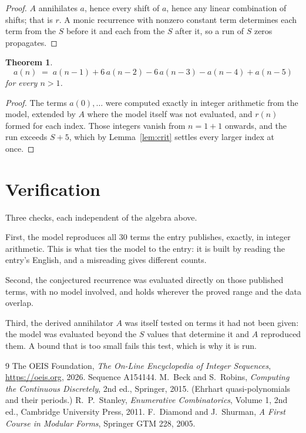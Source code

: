 \documentclass[11pt,a4paper]{article}
\theoremstyle{plain}
\newtheorem{theorem}{Theorem}
\theoremstyle{definition}
\begin{document}
\begin{proof}
$A$ annihilates $a$, hence every shift of $a$, hence any linear combination of shifts; that is
$r$. A monic recurrence with nonzero constant term determines each term from the $S$ before it
and each from the $S$ after it, so a run of $S$ zeros propagates.
\end{proof}

\begin{theorem}
\[
a(n)\;=\;a(n-1) + 6\,a(n-2) - 6\,a(n-3) - a(n-4) + a(n-5)
\]
for every $n>1$.
\end{theorem}

\begin{proof}
The terms $a(0),\dots$ were computed exactly in integer arithmetic from the model, extended by
$A$ where the model itself was not evaluated, and $r(n)$ formed for each index. Those integers
vanish from $n=1+1$ onwards, and the run exceeds $S+5$, which by
Lemma~\ref{lem:crit} settles every larger index at once.
\end{proof}

\section{Verification}

Three checks, each independent of the algebra above.

First, the model reproduces all $30$ terms the entry publishes, exactly, in integer
arithmetic. This is what ties the model to the entry: it is built by reading the entry's
English, and a misreading gives different counts.

Second, the conjectured recurrence was evaluated directly on those published terms, with no
model involved, and holds wherever the proved range and the data overlap.

Third, the derived annihilator $A$ was itself tested on terms it had not been given: the model
was evaluated beyond the $S$ values that determine it and $A$ reproduced them. A bound that is
too small fails this test, which is why it is run.

\begin{thebibliography}{9}
 The OEIS Foundation, \emph{The On-Line Encyclopedia of Integer
Sequences}, \url{https://oeis.org}, 2026. Sequence A154144.
 M.~Beck and S.~Robins, \emph{Computing the Continuous Discretely},
2nd ed., Springer, 2015. (Ehrhart quasi-polynomials and their periods.)
 R.~P.~Stanley, \emph{Enumerative Combinatorics}, Volume 1, 2nd ed.,
Cambridge University Press, 2011.
 F.~Diamond and J.~Shurman, \emph{A First Course in Modular Forms},
Springer GTM 228, 2005.
\end{thebibliography}
\end{document}
